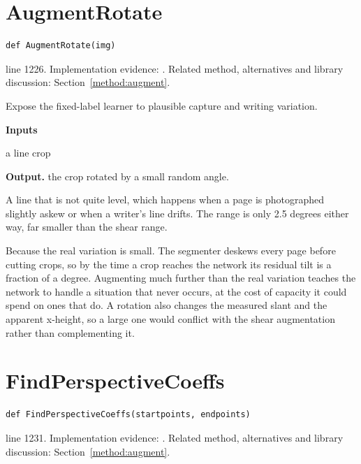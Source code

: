 \section{AugmentRotate}\label{fn:train:AugmentRotate}
\begin{lstlisting}[style=sig]
def AugmentRotate(img)
\end{lstlisting}
 line 1226. Implementation evidence: \cite{code2026}. Related method, alternatives and library discussion: Section~\ref{method:augment}.


Expose the fixed-label learner to plausible capture and writing variation.




\noindent\textbf{Inputs}
\begin{description}[leftmargin=2.2em,style=nextline,font=\normalfont\ttfamily]\setlength\itemsep{1pt}
  \item[{img}] \normalfont a line crop
\end{description}

\noindent\textbf{Output.} the crop rotated by a small random angle.


A line that is not quite level, which happens when a page is photographed slightly askew or when a writer's line drifts. The range is only 2.5 degrees either way, far smaller than the shear range.


Because the real variation is small. The segmenter deskews every page before cutting crops, so by the time a crop reaches the network its residual tilt is a fraction of a degree. Augmenting much further than the real variation teaches the network to handle a situation that never occurs, at the cost of capacity it could spend on ones that do. A rotation also changes the measured slant and the apparent x-height, so a large one would conflict with the shear augmentation rather than complementing it.



\section{FindPerspectiveCoeffs}\label{fn:train:FindPerspectiveCoeffs}
\begin{lstlisting}[style=sig]
def FindPerspectiveCoeffs(startpoints, endpoints)
\end{lstlisting}
 line 1231. Implementation evidence: \cite{code2026}. Related method, alternatives and library discussion: Section~\ref{method:augment}.


